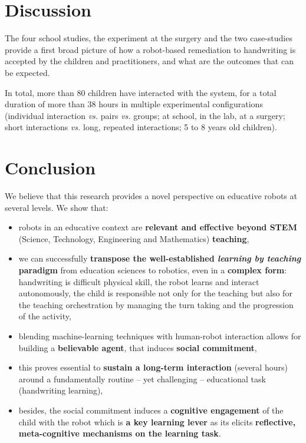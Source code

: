 \documentclass{article}
\newcommand{\vs}{\textit{vs.}\xspace}
\begin{document}
\section{Discussion}

The four school studies, the experiment at the surgery and the two case-studies
provide a first broad picture of how a robot-based remediation to handwriting
is accepted by the children and practitioners, and what are the outcomes that
can be expected.

In total, more than 80 children have interacted with the system, for a total
duration of more than 38 hours in multiple experimental configurations
(individual interaction \vs pairs \vs groups; at school, in the lab, at a
surgery; short interactions \vs long, repeated interactions; 5 to 8 years old
children).

\section{Conclusion}

We believe that this research provides a novel perspective on educative
robots at several levels. We show that:

\begin{itemize}
    \item robots in an educative context are \textbf{relevant and effective
        beyond STEM} (Science, Technology, Engineering and Mathematics)
    \textbf{teaching},

    \item we can successfully \textbf{transpose the well-established
        \emph{learning by teaching} paradigm} from education sciences to
        robotics, even in a \textbf{complex form}: handwriting is difficult
        physical skill, the robot learns and interact autonomously, the child is
        responsible not only for the teaching but also for the teaching
        orchestration by managing the turn taking and the progression of the
        activity,

    \item blending machine-learning techniques with human-robot interaction
        allows for building a \textbf{believable agent}, that induces
        \textbf{social commitment},

    \item this proves essential to \textbf{sustain a long-term interaction} (several
        hours) around a fundamentally routine -- yet challenging -- educational
        task (handwriting learning),

    \item besides, the social commitment induces a \textbf{cognitive engagement}
        of the child with the robot which is \textbf{a key learning lever} as
        its elicits \textbf{reflective, meta-cognitive mechanisms on the
        learning task}.
\end{itemize}
\end{document}
